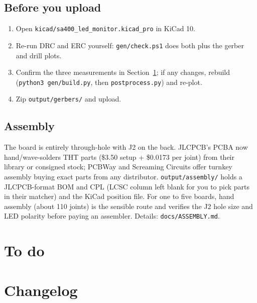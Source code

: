\documentclass[11pt,a4paper]{article}
\begin{document}
\subsection{Before you upload}
\begin{enumerate}[leftmargin=8mm]
\item Open \texttt{kicad/sa400\_led\_monitor.kicad\_pro} in KiCad 10.
\item Re-run DRC and ERC yourself: \texttt{gen/check.ps1} does both plus the gerber and drill plots.
\item Confirm the three measurements in Section~\ref{sec:todo}; if any changes, rebuild
(\texttt{python3 gen/build.py}, then \texttt{postprocess.py}) and re-plot.
\item Zip \texttt{output/gerbers/} and upload.
\end{enumerate}

\subsection{Assembly}
The board is entirely through-hole with J2 on the back. JLCPCB's PCBA now hand/wave-solders THT parts
(\$3.50 setup + \$0.0173 per joint) from their library or consigned stock; PCBWay and Screaming Circuits
offer turnkey assembly buying exact parts from any distributor. \texttt{output/assembly/} holds a
JLCPCB-format BOM and CPL (LCSC column left blank for you to pick parts in their matcher) and the KiCad
position file. For one to five boards, hand assembly (about 110 joints) is the sensible route and verifies
the J2 hole size and LED polarity before paying an assembler. Details: \texttt{docs/ASSEMBLY.md}.

\section{To do}\label{sec:todo}

\section{Changelog}

\end{document}
